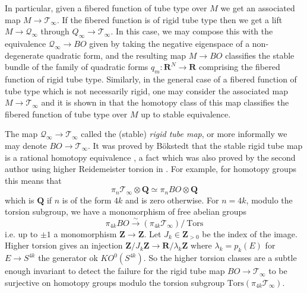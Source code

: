 \documentclass{amsart}
\newcommand\cQ{\mathcal{Q}}
\newcommand\cT{\mathcal{T}}
\def\bQ{\mathbf{Q}}
\def\bR{\mathbf{R}}
\def\bZ{\mathbf{Z}}
\theoremstyle{definition}
\theoremstyle{remark}
\newtheorem{inductive lemma}[theorem]{Inductive Lemma}
\begin{document}

In particular, given a fibered function of tube type over $M$ we get an associated map $M \to \cT_\infty$. If the fibered function is of rigid tube type then we get a lift $M \to \cQ_\infty$ through $Q_\infty \to \cT_\infty$. In this case, we may compose this with the equivalence $\cQ_\infty \to BO$ given by taking the negative eigenspace of a non-degenerate quadratic form, and the resulting map $M \to BO$ classifies the stable bundle of the family of quadratic forms $q_m: \bR^N \to \bR$ comprising the fibered function of rigid tube type. %
Similarly, in the general case of a fibered function of tube type which is not necessarily rigid, one may consider the associated map $M \to \cT_\infty$ and it is shown in \cite{W82} that the homotopy class of this map classifies the fibered function of tube type over $M$ up to stable equivalence.

The map $\cQ_\infty \to \cT_\infty$ called the (stable) {\em rigid tube map}, or more informally we may denote $BO \to \cT_\infty$. It was proved by B\"okstedt that the stable rigid tube map is a rational homotopy equivalence \cite{B82}, a fact which was also proved by the second author using higher Reidemeister torsion in \cite{I02}. For example, for homotopy groups this means that $$\pi_n \cT_\infty \otimes \bQ   \simeq \pi_n BO \otimes \bQ $$ 
which is $\bQ$ if $n$ is of the form $4k$ and is zero otherwise. For $n=4k$, modulo the torsion subgroup, we have a monomorphism of free abelian groups
$$\pi_{4k} BO \xrightarrow{\sim}  (\pi_{4k} \cT_\infty )/\ \text{Tors} $$ 
i.e. up to $\pm 1$ a monomorphism $\bZ \to \bZ$. Let $J_k \in \bZ_{>0}$ be the index of the image. Higher torsion gives an injection $\bZ/J_k\bZ \to \bR/\lambda_k\bZ$ where $\lambda_k = p_k(E)$ for $ E \to S^{4k}$ the generator ok $KO^0(S^{4k})$. So the higher torsion classes are a subtle enough invariant to detect the failure for the rigid tube map $BO \to \cT_\infty$ to be surjective on homotopy groups modulo the  torsion subgroup $\text{Tors} (  \pi_{4k} \cT_\infty )$.
\end{document}
